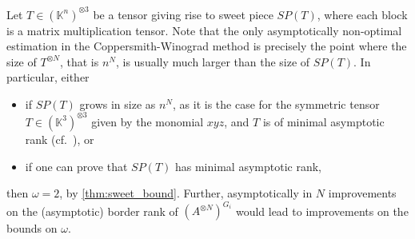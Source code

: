 \documentclass[a4paper,11pt,reqno]{amsart}
\newcommand{\bbK}{\mathbb{K}}
\numberwithin{equation}{section}
\theoremstyle{definition}
\theoremstyle{plain}
\theoremstyle{remark}
\begin{document}
Let $T\in (\bbK^{n})^{\otimes 3}$ be a tensor giving rise to sweet piece $SP(T)$, where each block is a matrix multiplication tensor.
Note that the only asymptotically non-optimal estimation in the Coppersmith-Winograd method is precisely the point where the size of $T^{\otimes N}$, that is $n^N$, is usually much larger than the size of $SP(T)$.
In particular, either
\begin{itemize}
\item if $SP(T)$ grows in size as $n^N$, as it is the case for the symmetric
    tensor $T\in (\bbK^3)^{\otimes 3}$ given by the monomial $xyz$, and $T$ is of minimal asymptotic rank (cf.~\cite[Remark 15.44]{BCS97}), or
\item if one can prove that $SP(T)$ has minimal asymptotic rank,
\end{itemize}
then $\omega=2$, by \autoref{thm:sweet_bound}. Further,
asymptotically in $N$ improvements on the (asymptotic) border rank of $(A^{\otimes N})^{G_i}$ would lead to improvements on the bounds on $\omega$.
\end{document}
